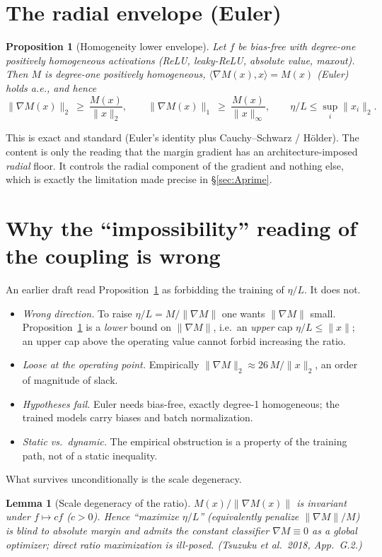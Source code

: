 \documentclass[11pt]{article}
\newtheorem{lemma}{Lemma}
\newtheorem{proposition}{Proposition}
\theoremstyle{definition}
\newcommand{\grad}{\nabla}
\begin{document}
\section{The radial envelope (Euler)}\label{sec:radial}
\begin{proposition}[Homogeneity lower envelope]\label{prop:euler}
Let $f$ be bias-free with degree-one positively homogeneous activations (ReLU,
leaky-ReLU, absolute value, maxout). Then $M$ is degree-one positively homogeneous,
$\langle\grad M(x),x\rangle=M(x)$ (Euler) holds a.e., and hence
\[
  \|\grad M(x)\|_2\ \ge\ \frac{M(x)}{\|x\|_2},\qquad
  \|\grad M(x)\|_1\ \ge\ \frac{M(x)}{\|x\|_\infty},\qquad
  \eta/L\le\sup_i\|x_i\|_2 .
\]
\end{proposition}
This is exact and standard (Euler's identity plus Cauchy--Schwarz / H\"older). The
content is only the reading that the margin gradient has an architecture-imposed
\emph{radial} floor. It controls the radial component of the gradient and nothing
else, which is exactly the limitation made precise in \S\ref{sec:Aprime}.

\section{Why the ``impossibility'' reading of the coupling is wrong}\label{sec:wrong}
An earlier draft read Proposition~\ref{prop:euler} as forbidding the training of
$\eta/L$. It does not.
\begin{itemize}
\item[(W1)] \emph{Wrong direction.} To raise $\eta/L=M/\|\grad M\|$ one wants
$\|\grad M\|$ small. Proposition~\ref{prop:euler} is a \emph{lower} bound on
$\|\grad M\|$, i.e.\ an \emph{upper} cap $\eta/L\le\|x\|$; an upper cap above the
operating value cannot forbid increasing the ratio.
\item[(W2)] \emph{Loose at the operating point.} Empirically
$\|\grad M\|_2\approx 26\,M/\|x\|_2$, an order of magnitude of slack.
\item[(W3)] \emph{Hypotheses fail.} Euler needs bias-free, exactly degree-1
homogeneous; the trained models carry biases and batch normalization.
\item[(W4)] \emph{Static vs.\ dynamic.} The empirical obstruction is a property of
the training path, not of a static inequality.
\end{itemize}
What survives unconditionally is the scale degeneracy.
\begin{lemma}[Scale degeneracy of the ratio]\label{lem:scale}
$M(x)/\|\grad M(x)\|$ is invariant under $f\mapsto cf$ ($c>0$). Hence ``maximize
$\eta/L$'' (equivalently penalize $\|\grad M\|/M$) is blind to absolute margin and
admits the constant classifier $\grad M\equiv0$ as a global optimizer; direct ratio
maximization is ill-posed. (Tsuzuku et al.\ 2018, App.\ G.2.)
\end{lemma}
\end{document}
